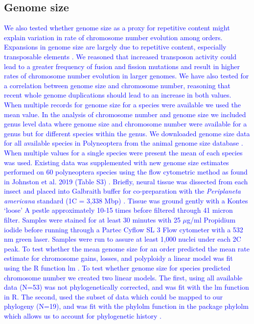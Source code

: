\documentclass[]{rsos}%
\begin{document}
\subsection{Genome size}
\textcolor{blue}{We also tested whether genome size as a proxy for repetitive content might explain variation in rate of chromosome number evolution among orders. 
Expansions in genome size are largely due to repetitive content, especially transposable elements \cite{kidwell2002transposable,bennetzen2005mechanisms}.
We reasoned that increased transposon activity could lead to a greater frequency of fusion and fission mutations and result in higher rates of chromosome number evolution in larger genomes.
We have also tested for a correlation between genome size and chromosome number, reasoning that recent whole genome duplications should lead to an increase in both values.
When multiple records for genome size for a species were available we used the mean value.
In the analysis of chromosome number and genome size we included genus level data where genome size and chromosome number were available for a genus but for different species within the genus.
We downloaded genome size data for all available species in Polyneoptera from the animal genome size database \cite{gregory2019}.
When multiple values for a single species were present the mean of each species was used.
Existing data was supplemented with new genome size estimates performed on 60 polyneoptera species using the flow cytometric method as found in Johnston et al. 2019 (Table S3) \cite{johnston2019}. 
Briefly, neural tissue was dissected from each insect and placed into Galbraith buffer for co-preparation with the \textit{Periplaneta americana} standard (1C = 3,338 Mbp) \cite{hanrahan2011}.
Tissue was ground gently with a Kontes ‘loose’ A pestle approximately 10-15 times before filtered through 41 micron filter.  Samples were stained for at least 30 minutes with 25 $\mu$g/ml Propidium iodide before running through a Partec Cyflow SL 3 Flow cytometer with a 532 nm green laser. 
Samples were run to assure at least 1,000 nuclei under each 2C peak.
To test whether the mean genome size for an order predicted the mean rate estimate for chromosome gains, losses, and polyploidy a linear model was fit using the R function lm \cite{R-citation}.
To test whether genome size for species predicted chromosome number we created two linear models. 
The first, using all available data (N=53) was not phylogenetically corrected, and was fit with the lm function in R.
The second, used the subset of data which could be mapped to our phylogeny (N=19), and was fit with the phylolm function in the package phylolm which allows us to account for phylogenetic history \cite{R-citation, phylolm}.}
\end{document}
